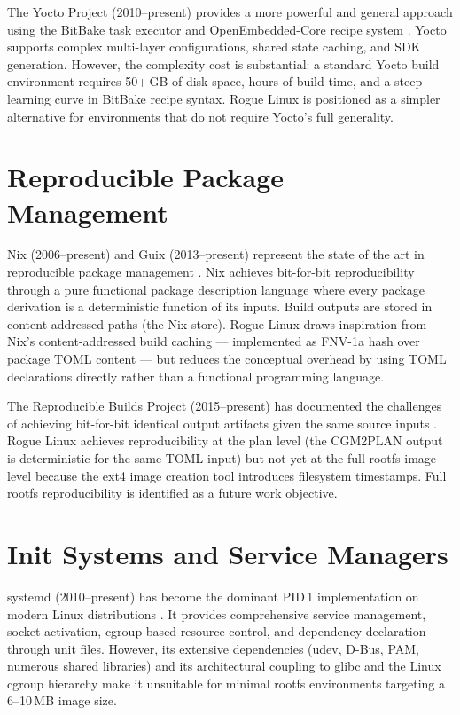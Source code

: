\documentclass[12pt,a4paper]{report}
\begin{document}
The Yocto Project (2010--present) provides a more powerful and general approach
using the BitBake task executor and OpenEmbedded-Core recipe system \cite{yocto}.
Yocto supports complex multi-layer configurations, shared state caching, and SDK
generation. However, the complexity cost is substantial: a standard Yocto build
environment requires 50+\,GB of disk space, hours of build time, and a steep
learning curve in BitBake recipe syntax. Rogue Linux is positioned as a simpler
alternative for environments that do not require Yocto's full generality.

\section{Reproducible Package Management}

Nix (2006--present) and Guix (2013--present) represent the state of the art in
reproducible package management \cite{nix}. Nix achieves bit-for-bit
reproducibility through a pure functional package description language where every
package derivation is a deterministic function of its inputs. Build outputs are
stored in content-addressed paths (the Nix store). Rogue Linux draws inspiration
from Nix's content-addressed build caching --- implemented as FNV-1a hash over
package TOML content --- but reduces the conceptual overhead by using TOML
declarations directly rather than a functional programming language.

The Reproducible Builds Project (2015--present) has documented the challenges of
achieving bit-for-bit identical output artifacts given the same source inputs
\cite{repro}. Rogue Linux achieves reproducibility at the plan level (the
CGM2PLAN output is deterministic for the same TOML input) but not yet at the full
rootfs image level because the ext4 image creation tool introduces filesystem
timestamps. Full rootfs reproducibility is identified as a future work objective.

\section{Init Systems and Service Managers}

systemd (2010--present) has become the dominant PID\,1 implementation on modern
Linux distributions \cite{systemd}. It provides comprehensive service management,
socket activation, cgroup-based resource control, and dependency declaration
through unit files. However, its extensive dependencies (udev, D-Bus, PAM,
numerous shared libraries) and its architectural coupling to glibc and the Linux
cgroup hierarchy make it unsuitable for minimal rootfs environments targeting a
6--10\,MB image size.
\end{document}
